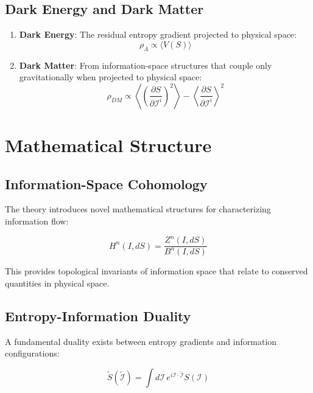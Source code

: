 \documentclass{article}
\begin{document}
\subsection{Dark Energy and Dark Matter}

\begin{enumerate}
\item \textbf{Dark Energy}:
   The residual entropy gradient projected to physical space:
   \begin{equation}
   \rho_\Lambda \propto \langle V(S) \rangle
   \end{equation}

\item \textbf{Dark Matter}:
   From information-space structures that couple only gravitationally when projected to physical space:
   \begin{equation}
   \rho_{DM} \propto \left\langle\left(\frac{\partial S}{\partial \mathcal{I}^i}\right)^2\right\rangle - \left\langle\frac{\partial S}{\partial \mathcal{I}^i}\right\rangle^2
   \end{equation}
\end{enumerate}

\section{Mathematical Structure}

\subsection{Information-Space Cohomology}

The theory introduces novel mathematical structures for characterizing information flow:

\begin{equation}
H^n(I, dS) = \frac{Z^n(I, dS)}{B^n(I, dS)}
\end{equation}

This provides topological invariants of information space that relate to conserved quantities in physical space.

\subsection{Entropy-Information Duality}

A fundamental duality exists between entropy gradients and information configurations:

\begin{equation}
\tilde{S}(\tilde{\mathcal{I}}) = \int d\mathcal{I} \, e^{i\mathcal{I}\cdot\tilde{\mathcal{I}}} S(\mathcal{I})
\end{equation}
\end{document}
